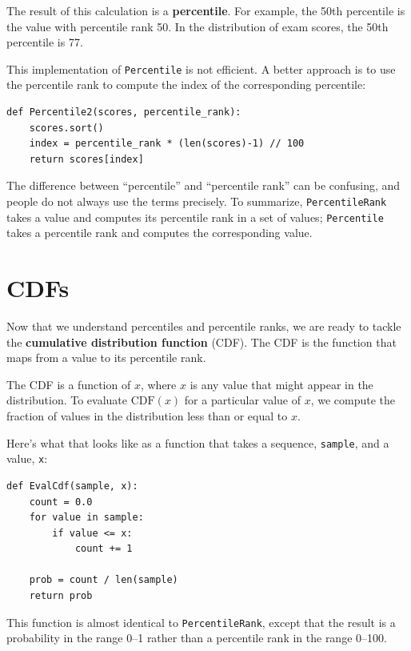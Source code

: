 \documentclass[12pt]{book}
\newcommand{\CDF}{\mathrm{CDF}}
\theoremstyle{exercise}
\begin{document}
The result of this calculation is a {\bf percentile}.  For example,
the 50th percentile is the value with percentile rank 50.  In the
distribution of exam scores, the 50th percentile is 77.%

This implementation of {\tt Percentile} is not efficient.  A
better approach is to use the percentile rank to compute the index of
the corresponding percentile:

\begin{verbatim}
def Percentile2(scores, percentile_rank):
    scores.sort()
    index = percentile_rank * (len(scores)-1) // 100
    return scores[index]
\end{verbatim}

The difference between ``percentile'' and ``percentile rank'' can
be confusing, and people do not always use the terms precisely.
To summarize, {\tt PercentileRank} takes a value and computes
its percentile rank in a set of values; {\tt Percentile} takes
a percentile rank and computes the corresponding value.%


\section{CDFs}%

Now that we understand percentiles and percentile ranks,
we are ready to tackle the {\bf cumulative distribution function}
(CDF).  The CDF is the function that maps from a value to its
percentile rank.%
%

The CDF is a function of $x$, where $x$ is any value that might appear
in the distribution.  To evaluate $\CDF(x)$ for a particular value of
$x$, we compute the fraction of values in the distribution less
than or equal to $x$.

Here's what that looks like as a function that takes a sequence,
{\tt sample}, and a value, {\tt x}:
%
\begin{verbatim}
def EvalCdf(sample, x):
    count = 0.0
    for value in sample:
        if value <= x:
            count += 1

    prob = count / len(sample)
    return prob
\end{verbatim}

This function is almost identical to {\tt PercentileRank}, except that
the result is a probability in the range 0--1 rather than a
percentile rank in the range 0--100.%
\end{document}
